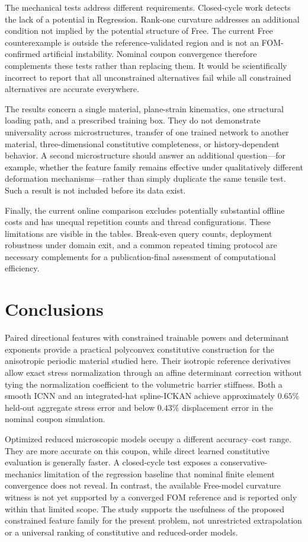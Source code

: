The mechanical tests address different requirements. Closed-cycle work detects the lack of a potential in Regression. Rank-one curvature addresses an additional condition not implied by the potential structure of Free. The current Free counterexample is outside the reference-validated region and is not an FOM-confirmed artificial instability. Nominal coupon convergence therefore complements these tests rather than replacing them. It would be scientifically incorrect to report that all unconstrained alternatives fail while all constrained alternatives are accurate everywhere.

The results concern a single material, plane-strain kinematics, one structural loading path, and a prescribed training box. They do not demonstrate universality across microstructures, transfer of one trained network to another material, three-dimensional constitutive completeness, or history-dependent behavior. A second microstructure should answer an additional question---for example, whether the feature family remains effective under qualitatively different deformation mechanisms---rather than simply duplicate the same tensile test. Such a result is not included before its data exist.

Finally, the current online comparison excludes potentially substantial offline costs and has unequal repetition counts and thread configurations. These limitations are visible in the tables. Break-even query counts, deployment robustness under domain exit, and a common repeated timing protocol are necessary complements for a publication-final assessment of computational efficiency.

\section{Conclusions}
Paired directional features with constrained trainable powers and determinant exponents provide a practical polyconvex constitutive construction for the anisotropic periodic material studied here. Their isotropic reference derivatives allow exact stress normalization through an affine determinant correction without tying the normalization coefficient to the volumetric barrier stiffness. Both a smooth ICNN and an integrated-hat spline-ICKAN achieve approximately $0.65\%$ held-out aggregate stress error and below $0.43\%$ displacement error in the nominal coupon simulation.

Optimized reduced microscopic models occupy a different accuracy--cost range. They are more accurate on this coupon, while direct learned constitutive evaluation is generally faster. A closed-cycle test exposes a conservative-mechanics limitation of the regression baseline that nominal finite element convergence does not reveal. In contrast, the available Free-model curvature witness is not yet supported by a converged FOM reference and is reported only within that limited scope. The study supports the usefulness of the proposed constrained feature family for the present problem, not unrestricted extrapolation or a universal ranking of constitutive and reduced-order models.

